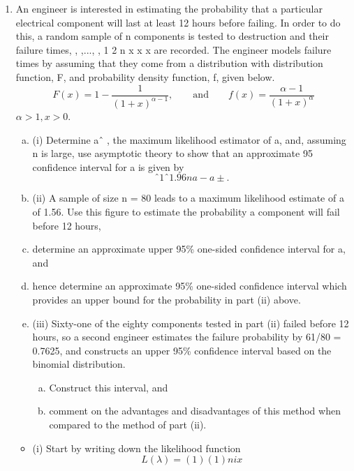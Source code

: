 \documentclass[a4paper,12pt]{article}
\begin{document}
\begin{enumerate}
\item  An engineer is interested in estimating the probability that a particular
electrical component will last at least 12 hours before failing. In order to do
this, a random sample of n components is tested to destruction and their
failure times, , ,..., , 1 2 n x x x are recorded. The engineer models failure times by
assuming that they come from a distribution with distribution function, F, and
probability density function, f, given below.
\[F(x) = 1 − \frac{1}{(1+x)^{\alpha − 1}}, \qquad \mbox{and} \qquad  f(x) = \frac{\alpha − 1}{( 1 + x )^\alpha}\]
$\alpha > 1, x > 0$.
\begin{enumerate}[(a)]
\item 
(i) Determine aˆ , the maximum likelihood estimator of a, and, assuming n
is large, use asymptotic theory to show that an approximate 95%
confidence interval for a is given by
\[ˆ 1 ˆ 1.96
n
a -
a ± . \]
\item (ii) A sample of size n = 80 leads to a maximum likelihood estimate of a of
1.56. Use this figure to
estimate the probability a component will fail before 12 hours,
\item determine an approximate upper 95\% one-sided confidence
interval for a, and
\item hence determine an approximate 95\% one-sided confidence
interval which provides an upper bound for the probability in
part (ii) above. 

\item (iii) Sixty-one of the eighty components tested in part (ii) failed before 12
hours, so a second engineer estimates the failure probability by
61/80 = 0.7625, and constructs an upper 95\% confidence interval based
on the binomial distribution.
\begin{enumerate}[(a)]
\item Construct this interval, and
\item comment on the advantages and disadvantages of this method
when compared to the method of part (ii). 
\end{enumerate}
\end{enumerate}
\newpage
\begin{itemize}
\item (i) Start by writing down the likelihood function
\[L(\lambda) =
( 1)
(1 )
n
i x\]


\end{itemize}
\end{enumerate}
\end{document}
